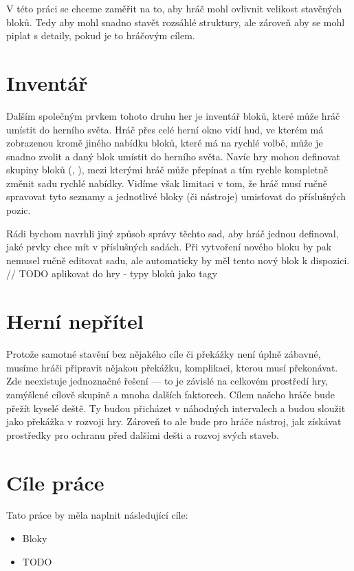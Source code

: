 V této práci se chceme zaměřit na to, aby hráč mohl ovlivnit velikost stavěných bloků. Tedy aby mohl snadno stavět rozsáhlé struktury, ale zároveň aby se mohl piplat s detaily, pokud je to hráčovým cílem.

\section{Inventář}
Dalším společným prvkem tohoto druhu her je inventář bloků, které může hráč umístit do herního světa. Hráč přes celé herní okno vidí \gls{hud}, ve kterém má zobrazenou kromě jiného nabídku bloků, které má na rychlé volbě, může je snadno zvolit a daný blok umístit do herního světa. Navíc hry mohou definovat skupiny bloků (\SE{}, \ME{}), mezi kterými hráč může přepínat a tím rychle kompletně změnit sadu rychlé nabídky. Vidíme však limitaci v tom, že hráč musí ručně spravovat tyto seznamy a jednotlivé bloky (či nástroje) umisťovat do příslušných pozic.

Rádi bychom navrhli jiný způsob správy těchto sad, aby hráč jednou definoval, jaké prvky chce mít v příslušných sadách. Při vytvoření nového bloku by pak nemusel ručně editovat sadu, ale automaticky by měl tento nový blok k dispozici.  // TODO aplikovat do hry - typy bloků jako tagy

\section{Herní nepřítel}
Protože samotné stavění bez nějakého cíle či překážky není úplně zábavné, musíme hráči připravit nějakou překážku, komplikaci, kterou musí překonávat. Zde neexistuje jednoznačné řešení --- to je závislé na celkovém prostředí hry, zamýšlené cílově skupině a mnoha dalších faktorech. Cílem našeho hráče bude přežít kyselé deště. Ty budou přicházet v náhodných intervalech a budou sloužit jako překážka v rozvoji hry. Zároveň to ale bude pro hráče nástroj, jak získávat prostředky pro ochranu před dalšími dešti a rozvoj svých staveb. 


\section{Cíle práce}
Tato práce by měla naplnit následující cíle:
\begin{itemize}
	\item Bloky
	\item TODO
\end{itemize}

\iffalse

